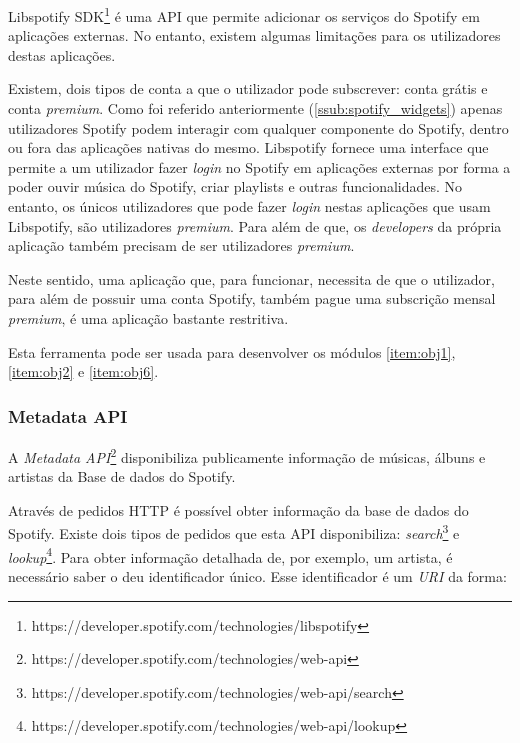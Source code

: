       Libspotify SDK\footnote{https://developer.spotify.com/technologies/libspotify} é uma API que permite adicionar os serviços do Spotify em aplicações externas.
      No entanto, existem algumas limitações para os utilizadores destas aplicações.
      
      Existem, dois tipos de conta a que o utilizador pode subscrever: conta grátis e conta \emph{premium}.
      Como foi referido anteriormente (\ref{ssub:spotify_widgets}) apenas utilizadores Spotify podem interagir com qualquer componente do Spotify, dentro ou fora das aplicações nativas do mesmo.
      Libspotify fornece uma interface que permite a um utilizador fazer \emph{login} no Spotify em aplicações externas por forma a poder ouvir música do Spotify, criar playlists e outras funcionalidades.
      No entanto, os únicos utilizadores que pode fazer \emph{login} nestas aplicações que usam Libspotify, são utilizadores \emph{premium}.
      Para além de que, os \emph{developers} da própria aplicação também precisam de ser utilizadores \emph{premium}.

      Neste sentido, uma aplicação que, para funcionar, necessita de que o utilizador, para além de possuir uma conta Spotify, também pague uma subscrição mensal \emph{premium}, é uma aplicação bastante restritiva.

      Esta ferramenta pode ser usada para desenvolver os módulos \ref{item:obj1}, \ref{item:obj2} e \ref{item:obj6}.
      



    \subsubsection{Metadata API} %
    \label{ssub:metadata_api}
    
      A \emph{Metadata API}\footnote{https://developer.spotify.com/technologies/web-api} disponibiliza publicamente informação de músicas, álbuns e artistas da Base de dados do Spotify.

      Através de pedidos HTTP é possível obter informação da base de dados do Spotify. Existe dois tipos de pedidos que esta API disponibiliza: \emph{search}\footnote{https://developer.spotify.com/technologies/web-api/search} e \emph{lookup}\footnote{https://developer.spotify.com/technologies/web-api/lookup}.
      Para obter informação detalhada de, por exemplo, um artista, é necessário saber o deu identificador único.
      Esse identificador é um \emph{URI} da forma:

